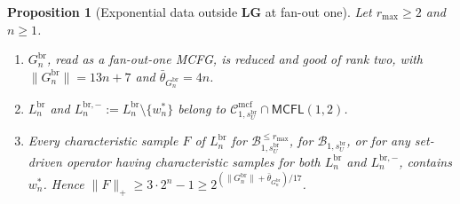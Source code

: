 \documentclass[11pt]{article}
\numberwithin{equation}{section}
\theoremstyle{plain}
\newtheorem{proposition}[theorem]{Proposition}
\theoremstyle{definition}
\theoremstyle{remark}
\newcommand{\Cmcf}[2]{\mathcal{C}^{\mathrm{mcf}}_{#1,#2}}
\theoremstyle{plain}
\begin{document}
\begin{proposition}[Exponential data outside $\mathbf{LG}$ at fan-out one]
\label{prop:fanout-one-lower}
Let $r_{\max}\ge2$ and $n\ge1$.
\begin{enumerate}[label=\textup{(\roman*)},leftmargin=*]
\item $G^{\mathrm{br}}_n$, read as a fan-out-one MCFG, is reduced and good of rank two,
with $\|G^{\mathrm{br}}_n\|=13n+7$ and $\bar\theta_{G^{\mathrm{br}}_n}=4n$.
\item $L^{\mathrm{br}}_n$ and $L^{\mathrm{br},-}_n:=L^{\mathrm{br}}_n\setminus\{w^*_n\}$ belong to
$\Cmcf{1}{s^{\mathrm{br}}_U}\cap\mathsf{MCFL}(1,2)$.
\item Every characteristic sample $F$ of $L^{\mathrm{br}}_n$ for
$\mathcal B^{\le r_{\max}}_{1,s^{\mathrm{br}}_U}$, for $\mathcal B_{1,s^{\mathrm{br}}_U}$, or for any
set-driven operator having characteristic samples for both $L^{\mathrm{br}}_n$ and
$L^{\mathrm{br},-}_n$, contains $w^*_n$.  Hence
$\|F\|_+\ge3\cdot2^n-1\ge2^{(\|G^{\mathrm{br}}_n\|+\bar\theta_{G^{\mathrm{br}}_n})/17}$.
\end{enumerate}
\end{proposition}
\end{document}
